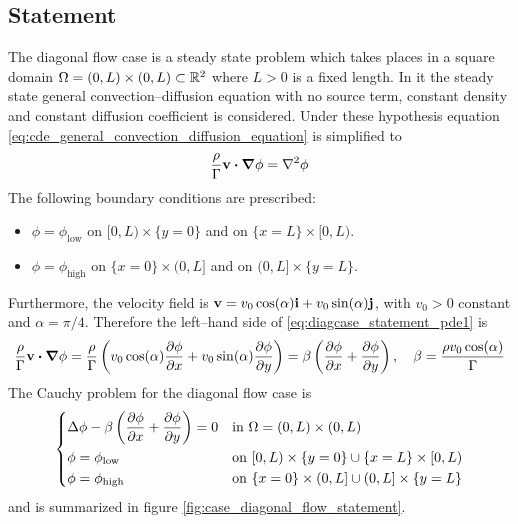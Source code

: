 
\subsection{Statement}

The diagonal flow case is a steady state problem which takes places in a square domain $\Omega = (0,L) \times (0,L) \subset \mathbb{R}^2$ where $L > 0$ is a fixed length. In it the steady state general convection--diffusion equation with no source term, constant density and constant diffusion coefficient is considered. Under these hypothesis equation \eqref{eq:cde_general_convection_diffusion_equation} is simplified to
\begin{equation} \label{eq:diagcase_statement_pde1}
	\frac{\rho}{\Gamma} \vb{v} \vdot \grad{\phi} = \laplacian{\phi}
\end{equation}
The following boundary conditions are prescribed:
\begin{itemize}[topsep=0pt]
	\item $\phi = \phi_\text{low}$ on $[0,L) \times \{ y = 0 \}$ and on $\{ x = L \} \times [0,L)$.
	\item $\phi = \phi_\text{high}$ on $\{ x = 0 \} \times (0,L]$ and on $(0,L] \times \{ y = L \}$.
\end{itemize}
Furthermore, the velocity field is $\vb{v} = v_0 \cos(\alpha) \vb{i} + v_0 \sin(\alpha) \vb{j}$, with $v_0 > 0$ constant and $\alpha = \pi / 4$. Therefore the left--hand side of \eqref{eq:diagcase_statement_pde1} is
\begin{equation}
	\frac{\rho}{\Gamma} \vb{v} \vdot \grad{\phi} = 
	\frac{\rho}{\Gamma} 
	\left( v_0 \cos(\alpha) \pdv{\phi}{x} + v_0 \sin(\alpha) \pdv{\phi}{y} \right) = 
	\beta \left( \pdv{\phi}{x} + \pdv{\phi}{y} \right), \quad
	\beta = \frac{\rho v_0 \cos(\alpha)}{\Gamma}
\end{equation}
The Cauchy problem for the diagonal flow case is
\begin{equation} \label{eq:diagcase_cauchy_problem}
	\left\{
	\begin{aligned}
		&\Delta \phi - \beta \left( \pdv{\phi}{x} + \pdv{\phi}{y} \right) = 0 &
		&\text{in } \Omega = (0,L) \times (0,L) \\
		&\phi = \phi_\text{low} &
		&\text{on } [0,L) \times \{ y = 0 \} \cup \{ x = L \} \times [0,L) \\
		&\phi = \phi_\text{high} &
		&\text{on } \{ x = 0 \} \times (0,L] \cup (0,L] \times \{ y = L \}
	\end{aligned}
	\right.
\end{equation}
and is summarized in figure \ref{fig:case_diagonal_flow_statement}.

